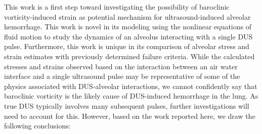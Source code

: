This work is a first step toward investigating the possibility of
baroclinic vorticity-induced strain as potential mechanism for
ultrasound-induced alveolar hemorrhage. This work is novel in its
modeling using the nonlinear equations of fluid motion to study the
dynamics of an alveolus interacting with a single \ac{DUS}
pulse. Furthermore, this work is unique in its comparison of alveolar
stress and strain estimates with previously determined failure
criteria. While the calculated stresses and strains observed based on
the interaction between an air water interface and a single ultrasound
pulse may be representative of some of the physics associated with
\ac{DUS}-alveolar interactions, we cannot confidently say that
baroclinic vorticity is the likely cause of \ac{DUS}-induced
hemorrhage in the lung. As true \ac{DUS} typically involves many
subsequent pulses, further investigations will need to account for
this. However, based on the work reported here, we draw the following
conclusions:

